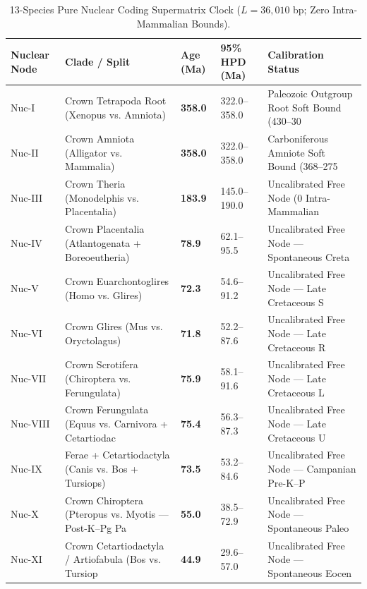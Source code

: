 \documentclass[10pt,letterpaper]{article}
\begin{document}
\begin{longtable}{lllll}
\caption{13-Species Pure Nuclear Coding Supermatrix Clock ($L = 36,010$ bp; Zero Intra-Mammalian Bounds).} \\
\toprule
Nuclear Node & Clade / Split & Age (Ma) & 95\% HPD (Ma) & Calibration Status \\
\midrule
\endfirsthead
Nuc-I & Crown Tetrapoda Root (Xenopus vs. Amniota) & \textbf{358.0} & 322.0--358.0 & Paleozoic Outgroup Root Soft Bound (430–30 \\
Nuc-II & Crown Amniota (Alligator vs. Mammalia) & \textbf{358.0} & 322.0--358.0 & Carboniferous Amniote Soft Bound (368–275  \\
Nuc-III & Crown Theria (Monodelphis vs. Placentalia) & \textbf{183.9} & 145.0--190.0 & Uncalibrated Free Node (0 Intra-Mammalian  \\
Nuc-IV & Crown Placentalia (Atlantogenata + Boreoeutheria) & \textbf{78.9} & 62.1--95.5 & Uncalibrated Free Node — Spontaneous Creta \\
Nuc-V & Crown Euarchontoglires (Homo vs. Glires) & \textbf{72.3} & 54.6--91.2 & Uncalibrated Free Node — Late Cretaceous S \\
Nuc-VI & Crown Glires (Mus vs. Oryctolagus) & \textbf{71.8} & 52.2--87.6 & Uncalibrated Free Node — Late Cretaceous R \\
Nuc-VII & Crown Scrotifera (Chiroptera vs. Ferungulata) & \textbf{75.9} & 58.1--91.6 & Uncalibrated Free Node — Late Cretaceous L \\
Nuc-VIII & Crown Ferungulata (Equus vs. Carnivora + Cetartiodac & \textbf{75.4} & 56.3--87.3 & Uncalibrated Free Node — Late Cretaceous U \\
Nuc-IX & Ferae + Cetartiodactyla (Canis vs. Bos + Tursiops) & \textbf{73.5} & 53.2--84.6 & Uncalibrated Free Node — Campanian Pre-K–P \\
Nuc-X & Crown Chiroptera (Pteropus vs. Myotis — Post-K–Pg Pa & \textbf{55.0} & 38.5--72.9 & Uncalibrated Free Node — Spontaneous Paleo \\
Nuc-XI & Crown Cetartiodactyla / Artiofabula (Bos vs. Tursiop & \textbf{44.9} & 29.6--57.0 & Uncalibrated Free Node — Spontaneous Eocen \\
\bottomrule
\end{longtable}
\end{document}

